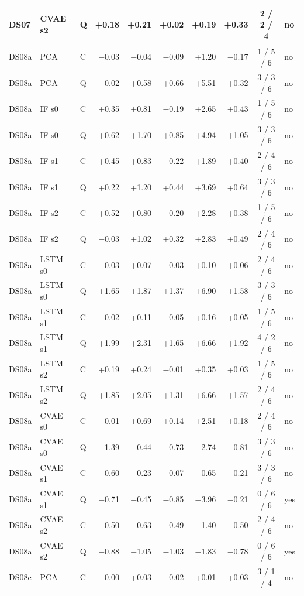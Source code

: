 \documentclass[10pt]{article}
\begin{document}
{\begin{longtable}{lllrrrrrcl}
DS07 & CVAE s2 & Q & +0.18 & +0.21 & +0.02 & +0.19 & +0.33 & 2 / 2 / 4 & no \\
\midrule
DS08a & PCA & C & −0.03 & −0.04 & −0.09 & +1.20 & −0.17 & 1 / 5 / 6 & no \\
DS08a & PCA & Q & −0.02 & +0.58 & +0.66 & +5.51 & +0.32 & 3 / 3 / 6 & no \\
DS08a & IF s0 & C & +0.35 & +0.81 & −0.19 & +2.65 & +0.43 & 1 / 5 / 6 & no \\
DS08a & IF s0 & Q & +0.62 & +1.70 & +0.85 & +4.94 & +1.05 & 3 / 3 / 6 & no \\
DS08a & IF s1 & C & +0.45 & +0.83 & −0.22 & +1.89 & +0.40 & 2 / 4 / 6 & no \\
DS08a & IF s1 & Q & +0.22 & +1.20 & +0.44 & +3.69 & +0.64 & 3 / 3 / 6 & no \\
DS08a & IF s2 & C & +0.52 & +0.80 & −0.20 & +2.28 & +0.38 & 1 / 5 / 6 & no \\
DS08a & IF s2 & Q & −0.03 & +1.02 & +0.32 & +2.83 & +0.49 & 2 / 4 / 6 & no \\
DS08a & LSTM s0 & C & −0.03 & +0.07 & −0.03 & +0.10 & +0.06 & 2 / 4 / 6 & no \\
DS08a & LSTM s0 & Q & +1.65 & +1.87 & +1.37 & +6.90 & +1.58 & 3 / 3 / 6 & no \\
DS08a & LSTM s1 & C & −0.02 & +0.11 & −0.05 & +0.16 & +0.05 & 1 / 5 / 6 & no \\
DS08a & LSTM s1 & Q & +1.99 & +2.31 & +1.65 & +6.66 & +1.92 & 4 / 2 / 6 & no \\
DS08a & LSTM s2 & C & +0.19 & +0.24 & −0.01 & +0.35 & +0.03 & 1 / 5 / 6 & no \\
DS08a & LSTM s2 & Q & +1.85 & +2.05 & +1.31 & +6.66 & +1.57 & 2 / 4 / 6 & no \\
DS08a & CVAE s0 & C & −0.01 & +0.69 & +0.14 & +2.51 & +0.18 & 2 / 4 / 6 & no \\
DS08a & CVAE s0 & Q & −1.39 & −0.44 & −0.73 & −2.74 & −0.81 & 3 / 3 / 6 & no \\
DS08a & CVAE s1 & C & −0.60 & −0.23 & −0.07 & −0.65 & −0.21 & 3 / 3 / 6 & no \\
DS08a & CVAE s1 & Q & −0.71 & −0.45 & −0.85 & −3.96 & −0.21 & 0 / 6 / 6 & yes \\
DS08a & CVAE s2 & C & −0.50 & −0.63 & −0.49 & −1.40 & −0.50 & 2 / 4 / 6 & no \\
DS08a & CVAE s2 & Q & −0.88 & −1.05 & −1.03 & −1.83 & −0.78 & 0 / 6 / 6 & yes \\
\midrule
DS08c & PCA & C & 0.00 & +0.03 & −0.02 & +0.01 & +0.03 & 3 / 1 / 4 & no \\

\end{longtable}}
\end{document}
